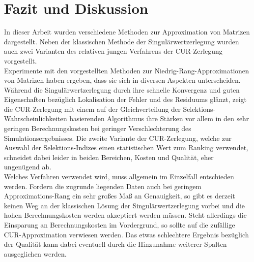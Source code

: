 \documentclass[12pt,a4paper,twoside]{article}
\begin{document}
\section{Fazit und Diskussion}
In dieser Arbeit wurden verschiedene Methoden zur Approximation von Matrizen dargestellt. Neben der klassischen Methode der Singulärwertzerlegung wurden auch zwei Varianten des relativen jungen Verfahrens der CUR-Zerlegung vorgestellt. \\
	Experimente mit den vorgestellten Methoden zur Niedrig-Rang-Approximationen von Matrizen haben ergeben, dass sie sich in diversen Aspekten unterscheiden. Während die Singulärwertzerlegung durch ihre schnelle Konvergenz und guten Eigenschaften bezüglich Lokalisation der Fehler und des Residuums glänzt, zeigt die CUR-Zerlegung mit einem auf der Gleichverteilung der Selektions-Wahrscheinlichkeiten basierenden Algorithmus ihre Stärken vor allem in den sehr geringen Berechnungskosten bei geringer Verschlechterung des Simulationsergebnisses. Die zweite Variante der CUR-Zerlegung, welche zur Auswahl der Selektions-Indizes einen statistischen Wert zum Ranking verwendet, schneidet dabei leider in beiden Bereichen, Kosten und Qualität, eher ungenügend ab. \\
	Welches Verfahren verwendet wird, muss allgemein im Einzelfall entschieden werden. Fordern die zugrunde liegenden Daten auch bei geringem Approximations-Rang ein sehr großes Maß an Genauigkeit, so gibt es derzeit keinen Weg an der klassischen Lösung der Singulärwertzerlegung vorbei und die hohen Berechnungskosten werden akzeptiert werden müssen. Steht allerdings die Einsparung an Berechnungskosten im Vordergrund, so sollte auf die zufällige CUR-Approximation verwiesen werden. Das etwas schlechtere Ergebnis bezüglich der Qualität kann dabei eventuell durch die Hinzunahme weiterer Spalten ausgeglichen werden.
	
	\newpage

\end{document}
